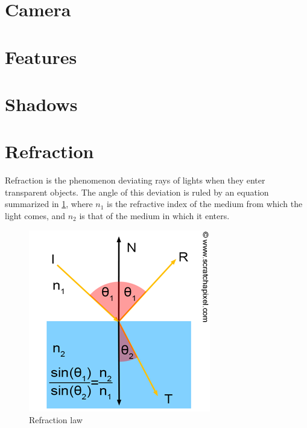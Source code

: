 \documentclass[a4paper,12pt,journal,twoside,compsoc]{PPIEEEtran}
\begin{document}
\section{Camera}

\section{Features}

\section{Shadows}

\section{Refraction}

Refraction is the phenomenon deviating rays of lights when they enter
transparent objects.  The angle of this deviation is ruled by an equation
summarized in \cref{fig:refr}, where $n_1$ is the refractive index of the medium
from which the light comes, and $n_2$ is that of the medium in which it enters.
\begin{figure}
  \begin{center}
    \includegraphics[width=0.7\linewidth]{refraction.png}
  \end{center}
  \caption{Refraction law}
  \label{fig:refr}
\end{figure}
\end{document}
